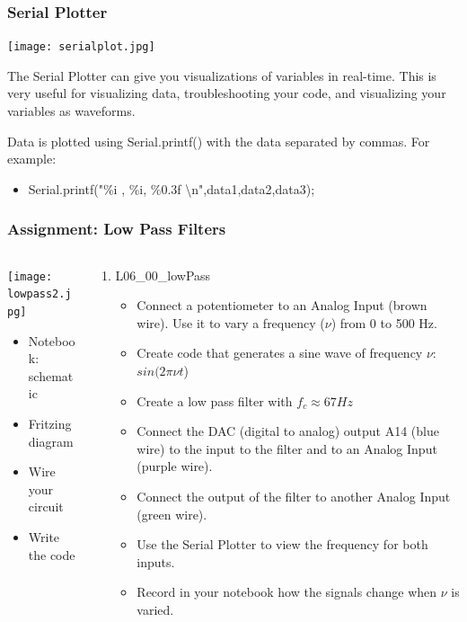 \documentclass{beamer}
\begin{document}
\begin{frame}\frametitle{Serial Plotter}
\begin{center}
\texttt{[image: serialplot.jpg]}
\end{center}

\vspace{0.5cm}

The Serial Plotter can give you visualizations of variables in real-time. This is very useful for visualizing data, troubleshooting your code, and visualizing your variables as waveforms.

Data is plotted using Serial.printf() with the data separated by commas. For example:
\begin{itemize}
\item Serial.printf("\%i , \%i, \%0.3f \textbackslash n",data1,data2,data3);
\end{itemize}

\end{frame}

\begin{frame}\frametitle{Assignment: Low Pass Filters}
\begin{columns}
\begin{column}{4cm}
\begin{center}
\texttt{[image: lowpass2.jpg]}
\begin{itemize}
\item Notebook: schematic
\item Fritzing diagram
\item Wire your circuit
\item Write the code
\end{itemize}
\end{center}
\end{column}
\begin{column}{8cm}
\begin{enumerate}
\item L06\_00\_lowPass
	\begin{itemize}
		\item Connect a potentiometer to an Analog Input (brown wire). Use it to vary a frequency ($\nu$) from 0 to 500 Hz.
		\item Create code that generates a sine wave of frequency $\nu$: $sin(2 \pi \nu t$)
		\item Create a low pass filter with $f_{c} \approx 67Hz$ 
		\item Connect the DAC (digital to analog) output A14 (blue wire) to the input to the filter and to an Analog Input (purple wire).
		\item Connect the output of the filter to another Analog Input (green wire).
		\item Use the Serial Plotter to view the frequency for both inputs.
		\item Record in your notebook how the signals change when $\nu$ is varied.
	\end{itemize}
\end{enumerate}
\end{column}
\end{columns}
\end{frame}
\end{document}
